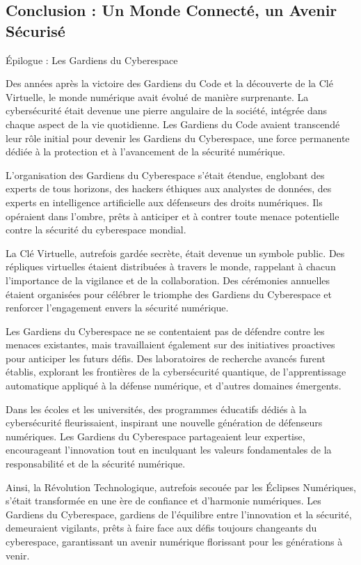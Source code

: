 \documentclass{./StyCls/MyArticle}
\begin{document}
\subsection{Conclusion : Un Monde Connecté, un Avenir Sécurisé}

Épilogue : Les Gardiens du Cyberespace

Des années après la victoire des Gardiens du Code et la découverte de la Clé Virtuelle, le monde numérique avait évolué de manière surprenante. La cybersécurité était devenue une pierre angulaire de la société, intégrée dans chaque aspect de la vie quotidienne. Les Gardiens du Code avaient transcendé leur rôle initial pour devenir les Gardiens du Cyberespace, une force permanente dédiée à la protection et à l'avancement de la sécurité numérique.

L'organisation des Gardiens du Cyberespace s'était étendue, englobant des experts de tous horizons, des hackers éthiques aux analystes de données, des experts en intelligence artificielle aux défenseurs des droits numériques. Ils opéraient dans l'ombre, prêts à anticiper et à contrer toute menace potentielle contre la sécurité du cyberespace mondial.

La Clé Virtuelle, autrefois gardée secrète, était devenue un symbole public. Des répliques virtuelles étaient distribuées à travers le monde, rappelant à chacun l'importance de la vigilance et de la collaboration. Des cérémonies annuelles étaient organisées pour célébrer le triomphe des Gardiens du Cyberespace et renforcer l'engagement envers la sécurité numérique.

Les Gardiens du Cyberespace ne se contentaient pas de défendre contre les menaces existantes, mais travaillaient également sur des initiatives proactives pour anticiper les futurs défis. Des laboratoires de recherche avancés furent établis, explorant les frontières de la cybersécurité quantique, de l'apprentissage automatique appliqué à la défense numérique, et d'autres domaines émergents.

Dans les écoles et les universités, des programmes éducatifs dédiés à la cybersécurité fleurissaient, inspirant une nouvelle génération de défenseurs numériques. Les Gardiens du Cyberespace partageaient leur expertise, encourageant l'innovation tout en inculquant les valeurs fondamentales de la responsabilité et de la sécurité numérique.

Ainsi, la Révolution Technologique, autrefois secouée par les Éclipses Numériques, s'était transformée en une ère de confiance et d'harmonie numériques. Les Gardiens du Cyberespace, gardiens de l'équilibre entre l'innovation et la sécurité, demeuraient vigilants, prêts à faire face aux défis toujours changeants du cyberespace, garantissant un avenir numérique florissant pour les générations à venir.
\end{document}
